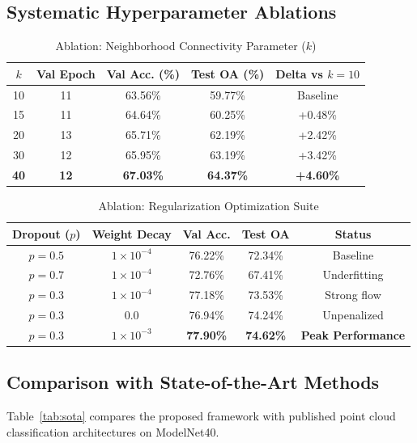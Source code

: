 \documentclass[conference]{IEEEtran}
\begin{document}
\subsection{Systematic Hyperparameter Ablations}
\begin{table}[htbp]
\caption{Ablation: Neighborhood Connectivity Parameter ($k$)}
\label{tab:ablation_k}
\centering
\begin{tabular}{ccccc}
\toprule
\textbf{$k$} & \textbf{Val Epoch} & \textbf{Val Acc. (\%)} & \textbf{Test OA (\%)} & \textbf{Delta vs $k=10$} \\
\midrule
10 & 11 & 63.56\% & 59.77\% & Baseline \\
15 & 11 & 64.64\% & 60.25\% & +0.48\% \\
20 & 13 & 65.71\% & 62.19\% & +2.42\% \\
30 & 12 & 65.95\% & 63.19\% & +3.42\% \\
\textbf{40} & \textbf{12} & \textbf{67.03\%} & \textbf{64.37\%} & \textbf{+4.60\%} \\
\bottomrule
\end{tabular}
\end{table}

\begin{table}[htbp]
\caption{Ablation: Regularization Optimization Suite}
\label{tab:ablation_reg}
\centering
\begin{tabular}{ccccc}
\toprule
\textbf{Dropout ($p$)} & \textbf{Weight Decay} & \textbf{Val Acc.} & \textbf{Test OA} & \textbf{Status} \\
\midrule
$p = 0.5$ & $1 \times 10^{-4}$ & 76.22\% & 72.34\% & Baseline \\
$p = 0.7$ & $1 \times 10^{-4}$ & 72.76\% & 67.41\% & Underfitting \\
$p = 0.3$ & $1 \times 10^{-4}$ & 77.18\% & 73.53\% & Strong flow \\
$p = 0.3$ & $0.0$ & 76.94\% & 74.24\% & Unpenalized \\
\textbf{$p = 0.3$} & \textbf{$1 \times 10^{-3}$} & \textbf{77.90\%} & \textbf{74.62\%} & \textbf{Peak Performance} \\
\bottomrule
\end{tabular}
\end{table}

\subsection{Comparison with State-of-the-Art Methods}
Table~\ref{tab:sota} compares the proposed framework with published point cloud classification architectures on ModelNet40.
\end{document}
